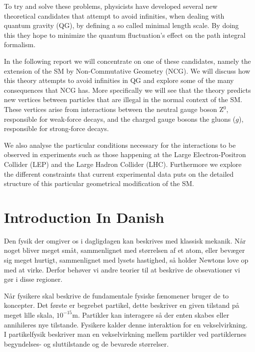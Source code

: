 To try and solve these problems, physicists have developed several new theoretical candidates that attempt to avoid infinities, when dealing with quantum gravity (QG), by defining a so called minimal length scale. By doing this they hope to minimize the quantum fluctuation's effect on the path integral formalism.

In the following report we will concentrate on one of these candidates, namely the extension of the SM by Non-Commutative Geometry (NCG). We will discuss how this theory attempts to avoid infinities in QG and explore some of the many consequences that NCG has. More specifically we will see that the theory predicts new vertices between particles that are illegal in the normal context of the SM. These vertices arise from interactions between the neutral gauge boson Z$^0$, responsible for weak-force decays, and the charged gauge bosons the gluons ($g$), responsible for strong-force decays.

We also analyse the particular conditions necessary for the interactions to be observed in experiments such as those happening at the Large Electron-Positron Collider (LEP) and the Large Hadron Collider (LHC). Furthermore we explore the different constraints that current experimental data puts on the detailed structure of this particular geometrical modification of the SM.

\newpage
\section{Introduction In Danish}

Den fysik der omgiver os i dagligdagen kan beskrives med klassisk mekanik. Når noget bliver meget småt, sammenlignet med størrelsen af et atom, eller bevæger sig meget hurtigt, sammenlignet med lysets hastighed, så holder Newtons love op med at virke. Derfor behøver vi andre teorier til at beskrive de obsevationer vi gør i disse regioner.

Når fysikere skal beskrive de fundamentale fysiske fænomener bruger de to koncepter. Det første er begrebet partikel, dette beskriver en given tilstand på meget lille skala, $10^{-15}$m. Partikler kan interagere så der enten skabes eller annihileres nye tilstande. Fysikere kalder denne interaktion for en vekselvirkning. I partikelfysik beskriver man en vekselvirkning mellem partikler ved partiklernes begyndelses- og sluttilstande og de bevarede størrelser.

